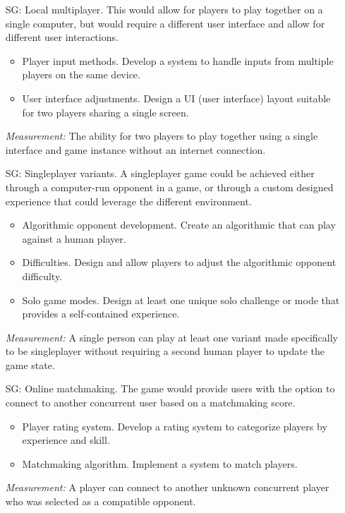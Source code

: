\begin{itemize}

	\item[SG\refstepcounter{goalnum}\thegoalnum \label{G_local_multiplayer}:] Local multiplayer. This would allow for players to play together on a single computer, but would require a different user interface and allow for different user interactions.
	\begin{itemize}
        \item Player input methods. Develop a system to handle inputs from multiple players on the same device.
        \item User interface adjustments. Design a UI (user interface) layout suitable for two players sharing a single screen.
    \end{itemize}
	\textit{Measurement:} The ability for two players to play together using a single interface and game instance without an internet connection.

	\item[SG\refstepcounter{goalnum}\thegoalnum \label{G_singleplayer}:] Singleplayer variants. A singleplayer game could be achieved either through a computer-run opponent in a game, or through a custom designed experience that could leverage the different environment.
	\begin{itemize}
        \item Algorithmic opponent development. Create an algorithmic that can play against a human player.
        \item Difficulties. Design and allow players to adjust the algorithmic opponent difficulty.
        \item Solo game modes. Design at least one unique solo challenge or mode that provides a self-contained experience.
    \end{itemize}
	\textit{Measurement:} A single person can play at least one variant made specifically to be singleplayer without requiring a second human player to update the game state.

	\item[SG\refstepcounter{goalnum}\thegoalnum \label{G_matchmaking}:] Online matchmaking. The game would provide users with the option to connect to another concurrent user based on a matchmaking score.
	\begin{itemize}
        \item Player rating system. Develop a rating system to categorize players by experience and skill.
        \item Matchmaking algorithm. Implement a system to match players.
    \end{itemize}
	\textit{Measurement:} A player can connect to another unknown concurrent player who was selected as a compatible opponent.


\end{itemize}
